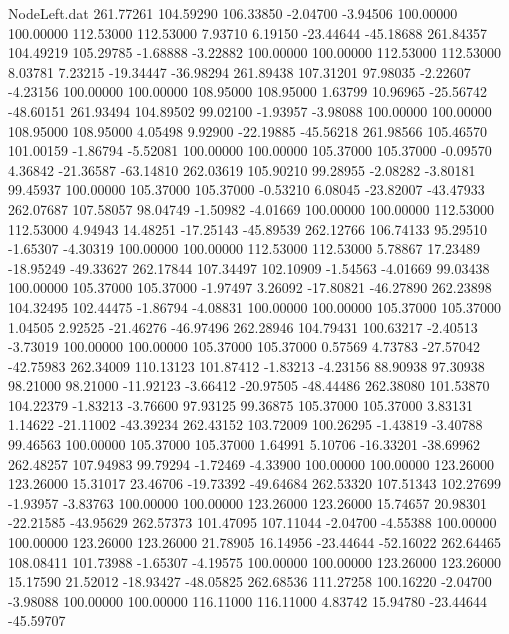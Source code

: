 \begin{filecontents}{NodeLeft.dat}
 261.77261  104.59290  106.33850    -2.04700   -3.94506  100.00000  100.00000  112.53000  112.53000    7.93710    6.19150  -23.44644  -45.18688
 261.84357  104.49219  105.29785    -1.68888   -3.22882  100.00000  100.00000  112.53000  112.53000    8.03781    7.23215  -19.34447  -36.98294
 261.89438  107.31201   97.98035    -2.22607   -4.23156  100.00000  100.00000  108.95000  108.95000    1.63799   10.96965  -25.56742  -48.60151
 261.93494  104.89502   99.02100    -1.93957   -3.98088  100.00000  100.00000  108.95000  108.95000    4.05498    9.92900  -22.19885  -45.56218
 261.98566  105.46570  101.00159    -1.86794   -5.52081  100.00000  100.00000  105.37000  105.37000   -0.09570    4.36842  -21.36587  -63.14810
 262.03619  105.90210   99.28955    -2.08282   -3.80181   99.45937  100.00000  105.37000  105.37000   -0.53210    6.08045  -23.82007  -43.47933
 262.07687  107.58057   98.04749    -1.50982   -4.01669  100.00000  100.00000  112.53000  112.53000    4.94943   14.48251  -17.25143  -45.89539
 262.12766  106.74133   95.29510    -1.65307   -4.30319  100.00000  100.00000  112.53000  112.53000    5.78867   17.23489  -18.95249  -49.33627
 262.17844  107.34497  102.10909    -1.54563   -4.01669   99.03438  100.00000  105.37000  105.37000   -1.97497    3.26092  -17.80821  -46.27890
 262.23898  104.32495  102.44475    -1.86794   -4.08831  100.00000  100.00000  105.37000  105.37000    1.04505    2.92525  -21.46276  -46.97496
 262.28946  104.79431  100.63217    -2.40513   -3.73019  100.00000  100.00000  105.37000  105.37000    0.57569    4.73783  -27.57042  -42.75983
 262.34009  110.13123  101.87412    -1.83213   -4.23156   88.90938   97.30938   98.21000   98.21000  -11.92123   -3.66412  -20.97505  -48.44486
 262.38080  101.53870  104.22379    -1.83213   -3.76600   97.93125   99.36875  105.37000  105.37000    3.83131    1.14622  -21.11002  -43.39234
 262.43152  103.72009  100.26295    -1.43819   -3.40788   99.46563  100.00000  105.37000  105.37000    1.64991    5.10706  -16.33201  -38.69962
 262.48257  107.94983   99.79294    -1.72469   -4.33900  100.00000  100.00000  123.26000  123.26000   15.31017   23.46706  -19.73392  -49.64684
 262.53320  107.51343  102.27699    -1.93957   -3.83763  100.00000  100.00000  123.26000  123.26000   15.74657   20.98301  -22.21585  -43.95629
 262.57373  101.47095  107.11044    -2.04700   -4.55388  100.00000  100.00000  123.26000  123.26000   21.78905   16.14956  -23.44644  -52.16022
 262.64465  108.08411  101.73988    -1.65307   -4.19575  100.00000  100.00000  123.26000  123.26000   15.17590   21.52012  -18.93427  -48.05825
 262.68536  111.27258  100.16220    -2.04700   -3.98088  100.00000  100.00000  116.11000  116.11000    4.83742   15.94780  -23.44644  -45.59707

\end{filecontents}
